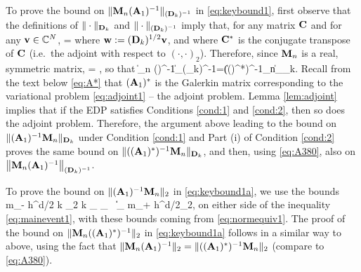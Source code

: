 To prove the bound on $\|\mathbf{M}_n(\mathbf{A}_{1})^{-1}\|_{(\mathbf{D}_k)^{-1}}$ in \eqref{eq:keybound1}, first observe that the definitions of $\|\cdot\|_{\mathbf{D}_k}$ and $\|\cdot\|_{(\mathbf{D}_k)^{-1}}$ imply that, for any matrix $\mathbf{C}$ and for any $\mathbf{v}\in \mathbb C^N$,
\beq\label{eq:A380-0}
 = 
\eeq
where $\mathbf{w} := (\mathbf{D}_k)^{1/2}\mathbf{v}$, and where $\mathbf{C}^*$ is the conjugate transpose of $\mathbf{C}$ (i.e.~the adjoint with respect to $(\cdot,\cdot)_2$).
Therefore, since $\mathbf{M}_n$ is a real, symmetric matrix,
\beqs%
=
,
 \eeqs
 so that 
\beq\label{eq:A380} 
 \big\|\Mmat_n (\Amato)^{-1}\big\|_{(\Dmat_k)^{-1}}=\big\|((\Amato)^*)^{-1}\Mmat_n\big\|_{\Dmat_k}.
 \eeq 
Recall from the text below \eqref{eq:A*} that $(\mathbf{A}_{1})^*$ is the Galerkin matrix corresponding to the variational problem \eqref{eq:adjoint1} -- the adjoint problem. Lemma \ref{lem:adjoint} implies that if the EDP %
satisfies Conditions \ref{cond:1} and \ref{cond:2}, then so does the adjoint problem. Therefore, the argument above leading to the bound on $\|(\mathbf{A}_{1})^{-1}\mathbf{M}_n\|_{\mathbf{D}_k}$ under Condition \ref{cond:1} and Part (i) of Condition \ref{cond:2} proves the same bound on $\|((\mathbf{A}_{1})^*)^{-1}\mathbf{M}_n\|_{\mathbf{D}_k}$, and then, using \eqref{eq:A380}, also on $\big\|\mathbf{M}_n(\mathbf{A}_{1})^{-1}\big\|_{(\mathbf{D}_k)^{-1}}$.

To prove the bound on  $\|(\mathbf{A}_{1})^{-1}\mathbf{M}_n\|_{2}$ in \eqref{eq:keybound1a}, we use the bounds 
\beqs
m_- h^{d/2} k \N{\tbu}_2 \leq k _{\LtDR} \leq {}_{\HokDR}
\,\tand\,
\big\|\big\|_{\LtDR} \leq m_+ h^{d/2}\N{\bff}_2,
\eeqs
on either side of the inequality \eqref{eq:mainevent1}, with these bounds coming from \eqref{eq:normequiv1}. The proof of the bound on 
$\|\mathbf{M}_n((\mathbf{A}_{1})^*)^{-1}\|_{2}$ in \eqref{eq:keybound1a} follows in a similar way to above, using the fact that 
$\|\mathbf{M}_n (\mathbf{A}_{1})^{-1}\|_2=\|((\mathbf{A}_{1})^*)^{-1}\mathbf{M}_n\|_2$ (compare to \eqref{eq:A380}).
%
%
\epf

